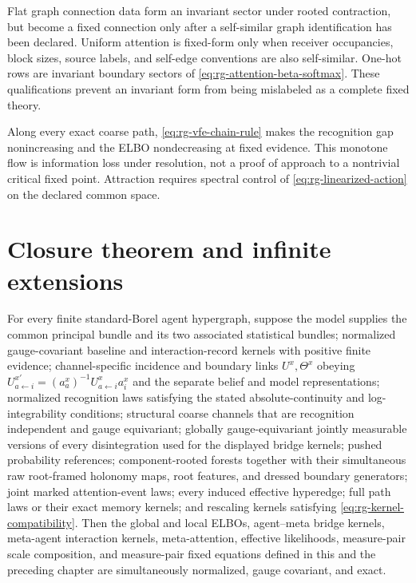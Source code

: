 Flat graph connection data form an invariant sector under rooted contraction,
but become a fixed connection only after a self-similar graph identification
has been declared.  Uniform attention is fixed-form only when receiver
occupancies, block sizes, source labels, and self-edge conventions are also
self-similar.  One-hot rows are invariant boundary sectors of
\eqref{eq:rg-attention-beta-softmax}.  These qualifications prevent an
invariant form from being mislabeled as a complete fixed theory.

Along every exact coarse path, \eqref{eq:rg-vfe-chain-rule} makes the recognition
gap nonincreasing and the ELBO nondecreasing at fixed evidence.  This monotone
flow is information loss under resolution, not a proof of approach to a
nontrivial critical fixed point.  Attraction requires spectral control of
\eqref{eq:rg-linearized-action} on the declared common space.

\section[Closure theorem]{Closure theorem and infinite extensions}
\label{sec:rg-closure-theorem}

For every finite standard-Borel agent hypergraph, suppose the model supplies
the common principal bundle and its two associated statistical bundles;
normalized gauge-covariant baseline and interaction-record kernels with
positive finite evidence; channel-specific incidence and boundary links
$U^x,\Theta^x$ obeying
$U_{a\leftarrow i}^{x\prime}=(a_a^x)^{-1}U_{a\leftarrow i}^xa_i^x$
and the separate belief and model representations; normalized recognition laws
satisfying the stated absolute-continuity and log-integrability conditions;
structural coarse channels that are recognition independent and gauge
equivariant; globally gauge-equivariant jointly measurable versions of every
disintegration used for the displayed bridge kernels; pushed probability
references; component-rooted forests together with their simultaneous raw
root-framed holonomy maps, root features, and dressed boundary generators;
joint marked attention-event laws; every
induced effective hyperedge; full path laws or their exact memory kernels; and
rescaling kernels satisfying
\eqref{eq:rg-kernel-compatibility}.  Then the global and local ELBOs,
agent--meta bridge kernels, meta-agent interaction kernels, meta-attention,
effective likelihoods, measure-pair scale composition, and measure-pair fixed
equations defined in this and the preceding chapter are simultaneously
normalized, gauge covariant, and exact.  

